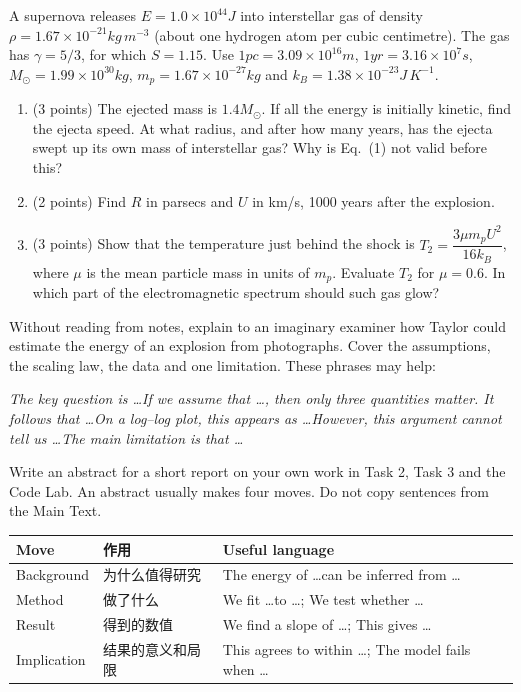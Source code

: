 \documentclass[11pt,a4paper]{article}
\begin{document}
A supernova releases $E=1.0\times10^{44}\unit{J}$ into interstellar gas of density $\rho=1.67\times10^{-21}\unit{kg\,m^{-3}}$ (about one hydrogen atom per cubic centimetre). The gas has $\gamma=5/3$, for which $S=1.15$. Use $1\unit{pc}=3.09\times10^{16}\unit{m}$, $1\unit{yr}=3.16\times10^{7}\unit{s}$, $M_\odot=1.99\times10^{30}\unit{kg}$, $m_p=1.67\times10^{-27}\unit{kg}$ and $k_B=1.38\times10^{-23}\unit{J\,K^{-1}}$.
\begin{enumerate}[label=\textbf{\Alph*.}]
  \item (3 points) The ejected mass is $1.4M_\odot$. If all the energy is initially kinetic, find the ejecta speed. At what radius, and after how many years, has the ejecta swept up its own mass of interstellar gas? Why is Eq.~(1) not valid before this?
  \item (2 points) Find $R$ in parsecs and $U$ in km/s, 1000 years after the explosion.
  \item (3 points) Show that the temperature just behind the shock is $T_2=\dfrac{3\mu m_pU^2}{16k_B}$, where $\mu$ is the mean particle mass in units of $m_p$. Evaluate $T_2$ for $\mu=0.6$. In which part of the electromagnetic spectrum should such gas glow?
\end{enumerate}


Without reading from notes, explain to an imaginary examiner how Taylor could estimate the energy of an explosion from photographs. Cover the assumptions, the scaling law, the data and one limitation. These phrases may help:

\begin{tipbox}\small
\textit{The key question is \dots \quad If we assume that \dots, then only three quantities matter. \quad It follows that \dots \quad On a log--log plot, this appears as \dots \quad However, this argument cannot tell us \dots \quad The main limitation is that \dots}
\end{tipbox}

Write an abstract for a short report on your own work in Task 2, Task 3 and the Code Lab. An abstract usually makes four moves. Do not copy sentences from the Main Text.

\begin{center}
\small
\begin{tabular}{p{2.6cm}p{5.0cm}p{7.5cm}}
\toprule
\headrow Move & 作用 & Useful language \\
\midrule
Background & 为什么值得研究 & The energy of \dots can be inferred from \dots \\
Method & 做了什么 & We fit \dots to \dots; We test whether \dots \\
Result & 得到的数值 & We find a slope of \dots; This gives \dots \\
Implication & 结果的意义和局限 & This agrees to within \dots; The model fails when \dots \\
\bottomrule
\end{tabular}
\end{center}
\end{document}

